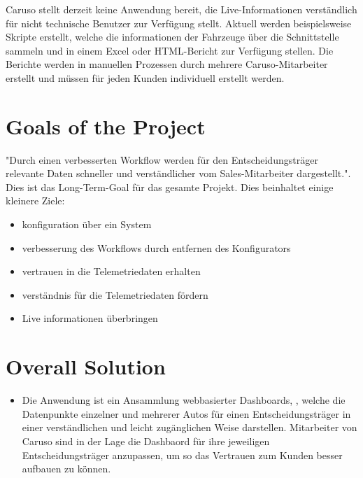 Caruso stellt derzeit keine Anwendung bereit, die Live-Informationen verständlich für nicht technische Benutzer zur Verfügung stellt. Aktuell werden beispielsweise Skripte erstellt, welche die informationen der Fahrzeuge über die Schnittstelle sammeln und in einem Excel oder HTML-Bericht zur Verfügung stellen. Die Berichte werden in manuellen Prozessen durch mehrere Caruso-Mitarbeiter erstellt und müssen für jeden Kunden individuell erstellt werden.
\section{Goals of the Project}
"Durch einen verbesserten Workflow werden für den Entscheidungsträger relevante Daten schneller und verständlicher vom Sales-Mitarbeiter dargestellt.". Dies ist das Long-Term-Goal für das gesamte Projekt. Dies beinhaltet einige kleinere Ziele:
\begin{itemize}
  \item konfiguration über ein System
  \item verbesserung des Workflows durch entfernen des Konfigurators
  \item vertrauen in die Telemetriedaten erhalten
  \item verständnis für die Telemetriedaten fördern
  \item Live informationen überbringen
\end{itemize}

\section{Overall Solution}
\begin{itemize}
  \item Die Anwendung ist ein Ansammlung webbasierter Dashboards, , welche die Datenpunkte einzelner und mehrerer Autos für einen Entscheidungsträger in einer verständlichen und leicht zugänglichen Weise darstellen. Mitarbeiter von Caruso sind in der Lage die Dashbaord für ihre jeweiligen Entscheidungsträger anzupassen, um so das Vertrauen zum Kunden besser aufbauen zu können.
\end{itemize}